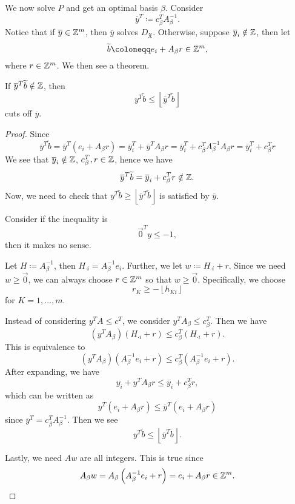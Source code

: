 We now solve \(P\) and get an optimal basis \(\beta\). Consider
\[
	\overline{y}^{T}\coloneqq c_{\beta}^{T}A^{-1}_{\beta}.
\]
Notice that if \(\overline{y}\in\mathbb{\MakeUppercase{Z}}^m\), then \(\overline{y}\) solves \(D_{\mathfrak{X}}\). Otherwise, suppose
\(\overline{y}_{i}\notin \mathbb{\MakeUppercase{Z}}\), then let
\[
	\widetilde{b}\coloneqq e_{i} + A_{\beta}r\in\mathbb{\MakeUppercase{Z}}^m,
\]
where \(r\in\mathbb{\MakeUppercase{Z}}^m\). We then see a theorem.
\begin{theorem}
	If \(\overline{y}^{T}\widetilde{b}\notin \mathbb{\MakeUppercase{Z}}\), then
	\[
		y^{T}\widetilde{b}\leq \left\lfloor \overline{y}^{T}\widetilde{b} \right\rfloor
	\]
	cuts off \(\overline{y}\).
\end{theorem}
\begin{proof}
	Since
	\[
		\overline{y}^{T}\widetilde{b} = \overline{y}^{T}(e_{i}+A_{\beta}r) = \overline{y}_{i}^{T} + \overline{y}^{T}A_{\beta}r = \overline{y}_{i}^{T} +c_{\beta}^{T}A^{-1}_{\beta}A_{\beta}r = \overline{y}_{i}^{T} +c^{T}_{\beta}r
	\]
	We see that \(\overline{y}_{i}\notin\mathbb{\MakeUppercase{Z}}\), \(c_{\beta}^{T}, r\in \mathbb{\MakeUppercase{Z}}\), hence we have
	\[
		\overline{y}^{T}\widetilde{b} = \overline{y}_{i}+c^{T}_{\beta}r\notin \mathbb{\MakeUppercase{Z}}.
	\]
	Now, we need to check that \(y^{T}\widetilde{b}\geq \left\lfloor \overline{y}^{T}\widetilde{b} \right\rfloor\) is satisfied by \(\overline{y}\).

	\hr
	\begin{intuition}
		Consider if the inequality is
		\[
			\vec{0}^{T}y\leq -1,
		\]
		then it makes no sense.
	\end{intuition}
	\hr

	Let \(H\coloneqq A^{-1}_{\beta}\), then \(H_{\cdot i} = A^{-1}_{\beta}e_{i}\). Further, we let \(w\coloneqq H_{\cdot i}+r\). Since we need
	\(w\geq \vec{0}\), we can always choose \(r\in \mathbb{\MakeUppercase{Z}}^m\) so that \(w\geq \vec{0}\). Specifically, we choose
	\[
		r_K \geq -\left\lfloor h_{Ki} \right\rfloor
	\] for \(K = 1, \ldots , m\).

	Instead of considering \(y^{T}A\leq c^{T}\), we consider \(y^{T}A_{\beta}\leq c_{\beta}^{T}\). Then we have
	\[
		\left(y^{T}A_{\beta}\right)\left(H_{\cdot i}+r\right) \leq c_{\beta}^{T}\left(H_{\cdot i}+r\right).
	\]
	This is equivalence to
	\[
		\left(y^{T}A_{\beta}\right)\left(A^{-1}_{\beta}e_{i}+r\right) \leq c_{\beta}^{T}\left(A^{-1}_{\beta}e_{i}+r\right).
	\]
	After expanding, we have
	\[
		y_{i}+y^{T}A_{\beta}r\leq \overline{y}_{i}+c_{\beta}^{T}r,
	\]
	which can be written as
	\[
		y^{T}\left(e_{i}+A_{\beta}r\right) \leq \overline{y}^{T}\left(e_{i}+A_{\beta}r\right)
	\]
	since \(\overline{y}^{T} = c_{\beta}^{T}A^{-1}_{\beta}\). Then we see
	\[
		y^{T}\widetilde{b}\leq \left\lfloor \overline{y}^{T}\widetilde{b} \right\rfloor.
	\]

	Lastly, we need \(Aw\) are all integers. This is true since
	\[
		A_{\beta}w = A_{\beta}\left(A^{-1}_{\beta}e_{i}+r\right) = e_{i}+A_{\beta}r \in \mathbb{\MakeUppercase{Z}}^m.
	\]
\end{proof}

